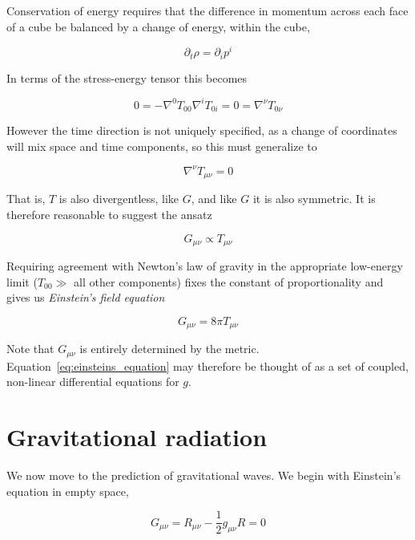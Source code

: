 Conservation of energy requires that the difference in momentum
across each face of a cube be balanced by a change of energy,
within the cube,

\begin{equation*}
\partial_t \rho = \partial_i p^i
\end{equation*}

In terms of the stress-energy tensor this becomes

\begin{equation*}
0 = - \nabla^0 T_{00} \nabla^i T_{0i} = 0
= \nabla^\nu T_{0 \nu}
\end{equation*}

However the time direction is not uniquely specified, as a change of
coordinates will mix space and time components, so this must
generalize to 

\begin{equation*}
\nabla^\nu T_{\mu\nu} = 0
\end{equation*}

That is, $T$ is also divergentless, like $G$, and like $G$ it is also
symmetric.  It is therefore reasonable to suggest the ansatz

\begin{equation*}
G_{\mu\nu} \propto T_{\mu\nu}
\end{equation*}

Requiring agreement with Newton's law of gravity in the appropriate
low-energy limit ($T_{00} \gg$ all other components) fixes the
constant of proportionality and gives us \emph{Einstein's field
equation}

\begin{equation}
\label{eq:einsteins_equation}
G_{\mu\nu} = 8\pi T_{\mu\nu}
\end{equation}


Note that $G_{\mu\nu}$ is entirely determined by the metric.
Equation~\ref{eq:einsteins_equation} may therefore be thought of as a
set of coupled, non-linear differential equations for $g$.

\section{Gravitational radiation}
\label{sec:gravitational_radiation}

We now move to the prediction of gravitational waves.  We begin with
Einstein's equation in empty space,

\begin{equation*}
G_{\mu\nu} = R_{\mu\nu} - \frac{1}{2} g_{\mu\nu} R = 0
\end{equation*}

